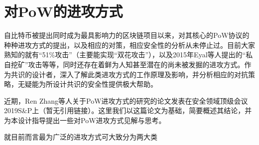 \section{对PoW的进攻方式}
自比特币被提出同时成为最具影响力的区块链项目以来，对其核心的PoW协议的种种进攻方式的提出，以及相应的对策，相应安全性的分析从未停止过。目前大家熟知的就有“51\%攻击”（主要能实现“双花攻击”），以及2015年Eyal等人提出的“私自挖矿”攻击等等，同时还存在着鲜为人知甚至潜在的尚未被发掘的进攻方式。作为共识的设计者，深入了解此类进攻方式的工作原理及影响，并分析相应的对抗策略，无疑能为所设计共识的安全性提供极大帮助。

近期，Ren Zhang等人关于PoW进攻方式的研究的论文发表在安全领域顶级会议2019S\&P上（暂无引用链接）。这里我们以这篇论文为基础，简要概述其结论，并为本设计指导提出一些对PoW进攻方式见解与思考。

就目前而言最为广泛的进攻方式可大致分为两大类
